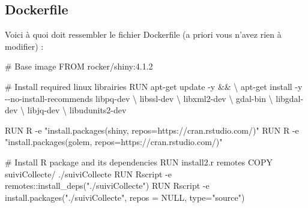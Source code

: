 \documentclass[
  letterpaper,
  DIV=11,
  numbers=noendperiod]{scrreprt}
\newenvironment{Shaded}{\begin{snugshade}}{\end{snugshade}}
\newcommand{\BuiltInTok}[1]{\textcolor[rgb]{0.00,0.23,0.31}{#1}}
\newcommand{\CommentTok}[1]{\textcolor[rgb]{0.37,0.37,0.37}{#1}}
\newcommand{\FloatTok}[1]{\textcolor[rgb]{0.68,0.00,0.00}{#1}}
\newcommand{\NormalTok}[1]{\textcolor[rgb]{0.00,0.23,0.31}{#1}}
\newcommand{\OperatorTok}[1]{\textcolor[rgb]{0.37,0.37,0.37}{#1}}
\newcommand{\StringTok}[1]{\textcolor[rgb]{0.13,0.47,0.30}{#1}}
\begin{document}
\hypertarget{dockerfile}{%
\subsection{Dockerfile}\label{dockerfile}}

Voici à quoi doit ressembler le fichier Dockerfile (a priori vous n'avez
rien à modifier) :

\begin{Shaded}
\begin{Highlighting}[]
\CommentTok{\# Base image}
\NormalTok{FROM rocker}\OperatorTok{/}\NormalTok{shiny:}\FloatTok{4.1.2}

\CommentTok{\# Install required linux librairies}
\NormalTok{RUN apt}\OperatorTok{{-}}\NormalTok{get update }\OperatorTok{{-}}\NormalTok{y }\OperatorTok{\&\&} \OperatorTok{\textbackslash{}}
\NormalTok{    apt}\OperatorTok{{-}}\NormalTok{get install }\OperatorTok{{-}}\NormalTok{y }\OperatorTok{{-}{-}}\NormalTok{no}\OperatorTok{{-}}\NormalTok{install}\OperatorTok{{-}}\NormalTok{recommends libpq}\OperatorTok{{-}}\NormalTok{dev }\OperatorTok{\textbackslash{}}
\NormalTok{                                               libssl}\OperatorTok{{-}}\NormalTok{dev }\OperatorTok{\textbackslash{}}
\NormalTok{                                               libxml2}\OperatorTok{{-}}\NormalTok{dev }\OperatorTok{\textbackslash{}}
\NormalTok{                                               gdal}\OperatorTok{{-}}\BuiltInTok{bin} \OperatorTok{\textbackslash{}}
\NormalTok{                                               libgdal}\OperatorTok{{-}}\NormalTok{dev }\OperatorTok{\textbackslash{}}
\NormalTok{                                               libjq}\OperatorTok{{-}}\NormalTok{dev }\OperatorTok{\textbackslash{}}
\NormalTok{                                               libudunits2}\OperatorTok{{-}}\NormalTok{dev }

\NormalTok{RUN R }\OperatorTok{{-}}\NormalTok{e }\StringTok{"install.packages(\textquotesingle{}shiny\textquotesingle{}, repos=\textquotesingle{}https://cran.rstudio.com/\textquotesingle{})"}
\NormalTok{RUN R }\OperatorTok{{-}}\NormalTok{e }\StringTok{"install.packages(\textquotesingle{}golem\textquotesingle{}, repos=\textquotesingle{}https://cran.rstudio.com/\textquotesingle{})"}

\CommentTok{\# Install R package and its dependencies}
\NormalTok{RUN install2.r remotes}
\NormalTok{COPY suiviCollecte}\OperatorTok{/}\NormalTok{ .}\OperatorTok{/}\NormalTok{suiviCollecte}
\NormalTok{RUN Rscript }\OperatorTok{{-}}\NormalTok{e }\StringTok{\textquotesingle{}remotes::install\_deps("./suiviCollecte")\textquotesingle{}}
\NormalTok{RUN Rscript }\OperatorTok{{-}}\NormalTok{e }\StringTok{\textquotesingle{}install.packages("./suiviCollecte", repos = NULL, type="source")\textquotesingle{}}


\end{Highlighting}
\end{Shaded}
\end{document}

